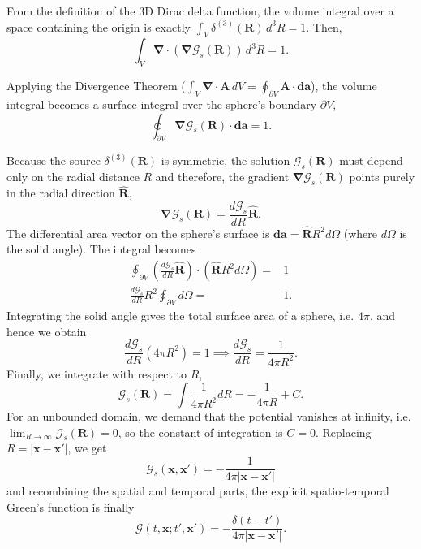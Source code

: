 From the definition of the 3D Dirac delta function, the volume integral over a space containing the origin is exactly $\int_V \delta^{(3)}(\textbf{R}) \, d^3R=1$. Then,
\begin{equation}
    \int_V \boldsymbol{\nabla} \cdot (\boldsymbol{\nabla} \mathcal{G}_s(\textbf{R})) \, d^3R = 1.
\end{equation}

Applying the Divergence Theorem ($\int_V \boldsymbol{\nabla} \cdot \textbf{A} \, dV = \oint_{\partial V} \textbf{A} \cdot \textbf{da}$), the volume integral becomes a surface integral over the sphere's boundary $\partial V$, 
\begin{equation}
    \oint_{\partial V} \boldsymbol{\nabla} \mathcal{G}_s(\textbf{R}) \cdot \textbf{da} = 1.
\end{equation}

Because the source $\delta^{(3)}(\textbf{R})$ is symmetric, the solution $\mathcal{G}_s(\textbf{R})$ must depend only on the radial distance $R$ and therefore, the gradient $\boldsymbol{\nabla} \mathcal{G}_s(\textbf{R})$ points purely in the radial direction $\hat{\textbf{R}}$,
\begin{equation}
    \boldsymbol{\nabla} \mathcal{G}_s(\textbf{R}) = \frac{d\mathcal{G}_s}{dR} \hat{\textbf{R}}.
\end{equation}
The differential area vector on the sphere's surface is $\textbf{da} = \hat{\textbf{R}} R^2 d\Omega$ (where $d\Omega$ is the solid angle). The integral becomes
\begin{align}
    \oint_{\partial V} \left( \frac{d\mathcal{G}_s}{dR} \hat{\textbf{R}} \right) \cdot \left( \hat{\textbf{R}} R^2 d\Omega \right) = &1 \\
    \frac{d\mathcal{G}_s}{dR} R^2 \oint_{\partial V} d\Omega = &1.
\end{align}
Integrating the solid angle gives the total surface area of a sphere, i.e.  $4\pi$, and hence we obtain
\begin{equation}
    \frac{d\mathcal{G}_s}{dR} (4\pi R^2) = 1 \implies \frac{d\mathcal{G}_s}{dR} = \frac{1}{4\pi R^2}.
\end{equation}
Finally, we integrate with respect to $R$,
\begin{equation}
    \mathcal{G}_s(\textbf{R}) = \int \frac{1}{4\pi R^2} dR = -\frac{1}{4\pi R} + C.
\end{equation}
For an unbounded domain, we demand that the potential vanishes at infinity, i.e. $\lim_{R \to \infty} \mathcal{G}_s(\textbf{R}) = 0$, so the constant of integration is $C = 0$. Replacing $R = |\textbf{x} - \textbf{x}'|$, we get
\begin{equation}
    \mathcal{G}_s(\textbf{x}, \textbf{x}') = -\frac{1}{4\pi |\textbf{x} - \textbf{x}'|}
\end{equation}
and recombining the spatial and temporal parts, the explicit spatio-temporal Green's function is finally
\begin{equation}
    \mathcal{G}(t, \textbf{x}; t', \textbf{x}') = -\frac{\delta(t - t')}{4\pi |\textbf{x} - \textbf{x}'|}. \label{eq:AppendixGreenFunction}
\end{equation}


